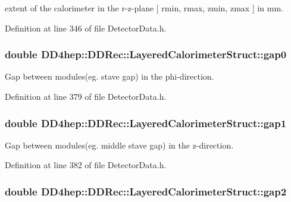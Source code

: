 extent of the calorimeter in the r-\/z-\/plane \mbox{[} rmin, rmax, zmin, zmax \mbox{]} in mm. 

Definition at line 346 of file DetectorData.h.\hypertarget{struct_d_d4hep_1_1_d_d_rec_1_1_layered_calorimeter_struct_aab4f81fe9fc897a94eadbd59ff308bdb}{
\subsubsection[{gap0}]{\setlength{\rightskip}{0pt plus 5cm}double {\bf DD4hep::DDRec::LayeredCalorimeterStruct::gap0}}}
\label{struct_d_d4hep_1_1_d_d_rec_1_1_layered_calorimeter_struct_aab4f81fe9fc897a94eadbd59ff308bdb}


Gap between modules(eg. stave gap) in the phi-\/direction. 

Definition at line 379 of file DetectorData.h.\hypertarget{struct_d_d4hep_1_1_d_d_rec_1_1_layered_calorimeter_struct_a0b341d9a31ccf086d69dc2602eed2eec}{
\subsubsection[{gap1}]{\setlength{\rightskip}{0pt plus 5cm}double {\bf DD4hep::DDRec::LayeredCalorimeterStruct::gap1}}}
\label{struct_d_d4hep_1_1_d_d_rec_1_1_layered_calorimeter_struct_a0b341d9a31ccf086d69dc2602eed2eec}


Gap between modules(eg. middle stave gap) in the z-\/direction. 

Definition at line 382 of file DetectorData.h.\hypertarget{struct_d_d4hep_1_1_d_d_rec_1_1_layered_calorimeter_struct_a72a13e8a8f2a42bdf6b5fa2e5bfad10d}{
\subsubsection[{gap2}]{\setlength{\rightskip}{0pt plus 5cm}double {\bf DD4hep::DDRec::LayeredCalorimeterStruct::gap2}}}
\label{struct_d_d4hep_1_1_d_d_rec_1_1_layered_calorimeter_struct_a72a13e8a8f2a42bdf6b5fa2e5bfad10d}


